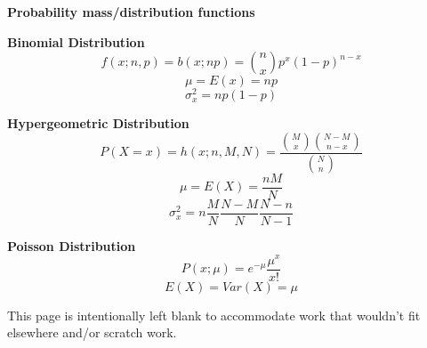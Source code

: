 \documentclass[letterpaper,12pt,addpoints]{exam}
\begin{document}
\centering \textbf{\large Probability mass/distribution functions}

\flushleft \textbf{Binomial Distribution}
$$f(x;n,p)=b(x;np)=\binom{n}{x}p^x(1-p)^{n-x}$$
$$\mu=E(x)=np$$
$$\sigma^2_x=np(1-p)$$

\flushleft \textbf{Hypergeometric Distribution}
$$P(X=x)=h(x;n,M,N)=\frac{\binom{M}{x}\binom{N-M}{n-x}}{\binom{N}{n}}$$
$$\mu=E(X)=\frac{nM}{N}$$
$$\sigma^2_x=n\frac{M}{N}\frac{N-M}{N}\frac{N-n}{N-1}$$

\flushleft \textbf{Poisson Distribution}
$$P(x;\mu)=e^{-\mu}\frac{\mu^x}{x!}$$
$$E(X)=Var(X)=\mu$$

\clearpage
This page is intentionally left blank to accommodate work that wouldn't fit elsewhere and/or scratch work.
\end{document}
